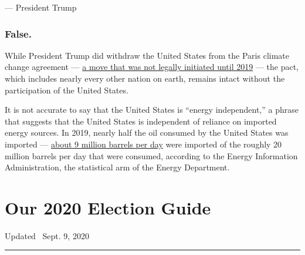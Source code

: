 --- President Trump

\hypertarget{false}{%
\subsubsection{False.}\label{false}}

While President Trump did withdraw the United States from the Paris
climate change agreement ---
\href{https://www.nytimes3xbfgragh.onion/2019/10/23/climate/trump-paris-climate-accord.html}{a
move that was not legally initiated until 2019} --- the pact, which
includes nearly every other nation on earth, remains intact without the
participation of the United States.

It is not accurate to say that the United States is ``energy
independent,'' a phrase that suggests that the United States is
independent of reliance on imported energy sources. In 2019, nearly half
the oil consumed by the United States was imported ---
\href{https://www.eia.gov/tools/faqs/faq.php?id=727\&t=6\#:~:text=In\%202019\%2C\%20the\%20United\%20States,(including\%20ethanol\%20and\%20biodiesel).}{about
9 million barrels per day} were imported of the roughly 20 million
barrels per day that were consumed, according to the Energy Information
Administration, the statistical arm of the Energy Department.

\hypertarget{our-2020-election-guide}{%
\section{Our 2020 Election Guide}\label{our-2020-election-guide}}

Updated ~Sept. 9, 2020

\begin{center}\rule{0.5\linewidth}{\linethickness}\end{center}

